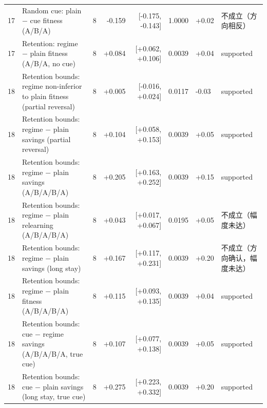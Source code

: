 \begin{table}[t]
{\begin{tabular}{@{}llrrrrll@{}}
17 & Random cue: plain $-$ cue fitness (A/B/A) & 8 & -0.159 & [-0.175, -0.143] & 1.0000 & +0.02 & 不成立（方向相反） \\
17 & Retention: regime $-$ plain fitness (A/B/A, no cue) & 8 & +0.084 & [+0.062, +0.106] & 0.0039 & +0.04 & supported \\
18 & Retention bounds: regime non-inferior to plain fitness (partial reversal) & 8 & +0.005 & [-0.016, +0.024] & 0.0117 & -0.03 & supported \\
18 & Retention bounds: regime $-$ plain savings (partial reversal) & 8 & +0.104 & [+0.058, +0.153] & 0.0039 & +0.05 & supported \\
18 & Retention bounds: regime $-$ plain savings (A/B/A/B/A) & 8 & +0.205 & [+0.163, +0.252] & 0.0039 & +0.15 & supported \\
18 & Retention bounds: regime $-$ plain relearning (A/B/A/B/A) & 8 & +0.043 & [+0.017, +0.067] & 0.0195 & +0.05 & 不成立（幅度未达） \\
18 & Retention bounds: regime $-$ plain savings (long stay) & 8 & +0.167 & [+0.117, +0.231] & 0.0039 & +0.20 & 不成立（方向确认，幅度未达） \\
18 & Retention bounds: regime $-$ plain fitness (A/B/A/B/A) & 8 & +0.115 & [+0.093, +0.135] & 0.0039 & +0.04 & supported \\
18 & Retention bounds: cue $-$ regime savings (A/B/A/B/A, true cue) & 8 & +0.107 & [+0.077, +0.138] & 0.0039 & +0.05 & supported \\
18 & Retention bounds: cue $-$ plain savings (long stay, true cue) & 8 & +0.275 & [+0.223, +0.332] & 0.0039 & +0.20 & supported \\
\bottomrule\end{tabular}}\end{table}
